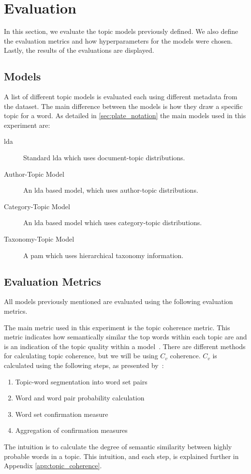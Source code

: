 \section{Evaluation}\label{sec:experiment}
In this section, we evaluate the topic models previously defined.
We also define the evaluation metrics and how hyperparameters for the models were chosen.
Lastly, the results of the evaluations are displayed.

\subsection{Models}\label{sec:experiment_models}
A list of different topic models is evaluated each using different metadata from the dataset.
The main difference between the models is how they draw a specific topic for a word.
As detailed in \autoref{sec:plate_notation} the main models used in this experiment are:
\begin{description}
	\item[\Acrlong{lda}] Standard \gls{lda} which uses document-topic distributions.
	\item[Author-Topic Model]\cite{author_topic_2012} An \gls{lda} based model, which uses author-topic distributions.
	\item[Category-Topic Model] An \gls{lda} based model which uses category-topic distributions.
	\item[Taxonomy-Topic Model] A \acrlong{pam} which uses hierarchical taxonomy information.
\end{description}

\subsection{Evaluation Metrics}\label{sec:experiment_metrics}
All models previously mentioned are evaluated using the following evaluation metrics.

The main metric used in this experiment is the topic coherence metric.
This metric indicates how semantically similar the top words within each topic are and is an indication of the topic quality within a model~\cite{topic_coherence_2015}.
There are different methods for calculating topic coherence, but we will be using $C_v$ coherence.
$C_v$ is calculated using the following steps, as presented by~\citet{Syed2017coherence}:
\begin{enumerate}
	\item Topic-word segmentation into word set pairs
	\item Word and word pair probability calculation
	\item Word set confirmation measure
	\item Aggregation of confirmation measures
\end{enumerate}
The intuition is to calculate the degree of semantic similarity between highly probable words in a topic.
This intuition, and each step, is explained further in Appendix \autoref{app:topic_coherence}.

